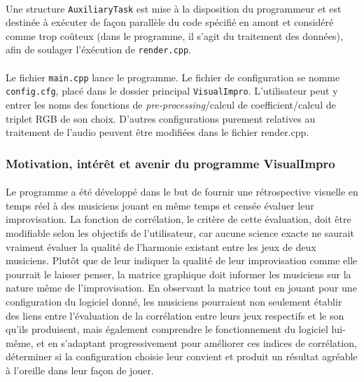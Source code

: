 \paragraph{}
Une structure \verb!AuxiliaryTask! est mise à la disposition du
programmeur et est destinée à exécuter de façon parallèle du code spécifié
en amont et considéré comme trop coûteux (dans le programme, il s'agit du
traitement des données), afin de soulager l'éxécution de \verb!render.cpp!.

\paragraph{}
Le fichier \verb!main.cpp! lance le programme. Le fichier de
configuration se nomme \\\verb!config.cfg!, placé dans le dossier
principal \verb!VisualImpro!.  L'utilisateur peut y entrer les noms
des fonctions de \textit{pre-processing}/calcul de coefficient/calcul
de triplet RGB de son choix. D'autres configurations purement
relatives au traitement de l'audio peuvent être modifiées dans le
fichier render.cpp.

\subsubsection{Motivation, intérêt et avenir du programme VisualImpro}
\paragraph{}
Le programme a été développé dans le but de fournir une rétrospective
visuelle en temps réel à des musiciens jouant en même temps et censée
évaluer leur improvisation. La fonction de corrélation, le critère de
cette évaluation, doit être modifiable selon les objectifs de
l'utilisateur, car aucune science exacte ne saurait vraiment évaluer
la qualité de l'harmonie existant entre les jeux de deux
musiciens. Plutôt que de leur indiquer la qualité de leur
improvisation comme elle pourrait le laisser penser, la matrice
graphique doit informer les musiciens sur la nature même de
l'improvisation. En observant la matrice tout en jouant pour une
configuration du logiciel donné, les musiciens pourraient non
seulement établir des liens entre l'évaluation de la corrélation entre
leurs jeux respectifs et le son qu'ils produisent, mais également
comprendre le fonctionnement du logiciel lui-même, et en s'adaptant
progressivement pour améliorer ces indices de corrélation, déterminer
si la configuration choisie leur convient et produit un résultat
agréable à l'oreille dans leur façon de jouer.

